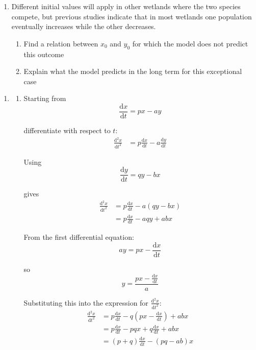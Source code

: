 \documentclass[leqno]{article}
\begin{document}
\begin{enumerate}[
  label=\textbf{\arabic*.},
  leftmargin=*,
  topsep=0pt,
  partopsep=0pt,
  parsep=0pt
]
\begin{enumerate}[label=\textbf{(\alph*)}, resume]
\begin{enumerate}[label=(\roman*)]
  \end{enumerate}
  \item Different initial values will apply in other wetlands where the two species compete, but previous studies indicate that in most wetlands one population eventually increases while the other decreases.\\
  \begin{enumerate}[label=(\roman*)]
    \item Find a relation between $x_0$ and $y_0$ for which the model does not predict this outcome  
    \item Explain what the model predicts in the long term for this exceptional case  
  \end{enumerate}
\end{enumerate}

\vspace*{10pt}

\begin{djsSolution}
\begin{enumerate}[label=\textbf{(\alph*)}]
  \item
  \begin{enumerate}[label=(\roman*)]
    \item Starting from
    \[
    \frac{\mathrm{d}x}{\mathrm{d}t}=px-ay
    \]

    differentiate with respect to $t$:
    \begin{align*}
    \frac{\mathrm{d}^2x}{\mathrm{d}t^2}
    &=p\frac{\mathrm{d}x}{\mathrm{d}t}-a\frac{\mathrm{d}y}{\mathrm{d}t}
    \end{align*}

    Using
    \[
    \frac{\mathrm{d}y}{\mathrm{d}t}=qy-bx
    \]

    gives
    \begin{align*}
    \frac{\mathrm{d}^2x}{\mathrm{d}t^2}
    &=p\frac{\mathrm{d}x}{\mathrm{d}t}-a(qy-bx) \\
    &=p\frac{\mathrm{d}x}{\mathrm{d}t}-aqy+abx
    \end{align*}

    From the first differential equation:
    \[
    ay=px-\frac{\mathrm{d}x}{\mathrm{d}t}
    \]

    so
    \[
    y=\frac{px-\frac{\mathrm{d}x}{\mathrm{d}t}}{a}
    \]

    Substituting this into the expression for $\frac{\mathrm{d}^2x}{\mathrm{d}t^2}$:
    \begin{align*}
    \frac{\mathrm{d}^2x}{\mathrm{d}t^2}
    &=p\frac{\mathrm{d}x}{\mathrm{d}t}-q\left(px-\frac{\mathrm{d}x}{\mathrm{d}t}\right)+abx \\
    &=p\frac{\mathrm{d}x}{\mathrm{d}t}-pqx+q\frac{\mathrm{d}x}{\mathrm{d}t}+abx \\
    &=(p+q)\frac{\mathrm{d}x}{\mathrm{d}t}-(pq-ab)x
    \end{align*}


\end{enumerate}
\end{enumerate}
\end{djsSolution}
\end{enumerate}
\end{document}
